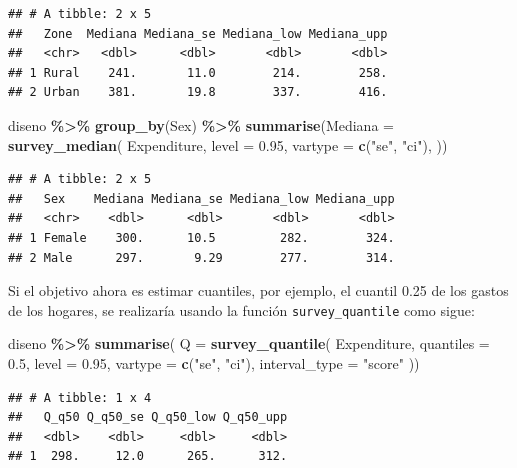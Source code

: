 \documentclass[
  spanish,
  12pt,
]{book}
\newenvironment{Shaded}{\begin{snugshade}}{\end{snugshade}}
\newcommand{\AttributeTok}[1]{\textcolor[rgb]{0.13,0.29,0.53}{#1}}
\newcommand{\FloatTok}[1]{\textcolor[rgb]{0.00,0.00,0.81}{#1}}
\newcommand{\FunctionTok}[1]{\textcolor[rgb]{0.13,0.29,0.53}{\textbf{#1}}}
\newcommand{\NormalTok}[1]{#1}
\newcommand{\SpecialCharTok}[1]{\textcolor[rgb]{0.81,0.36,0.00}{\textbf{#1}}}
\newcommand{\StringTok}[1]{\textcolor[rgb]{0.31,0.60,0.02}{#1}}
\begin{document}
\begin{verbatim}
## # A tibble: 2 x 5
##   Zone  Mediana Mediana_se Mediana_low Mediana_upp
##   <chr>   <dbl>      <dbl>       <dbl>       <dbl>
## 1 Rural    241.       11.0        214.        258.
## 2 Urban    381.       19.8        337.        416.
\end{verbatim}

\begin{Shaded}
\begin{Highlighting}[]
\NormalTok{diseno }\SpecialCharTok{\%\textgreater{}\%} \FunctionTok{group\_by}\NormalTok{(Sex) }\SpecialCharTok{\%\textgreater{}\%}
  \FunctionTok{summarise}\NormalTok{(}\AttributeTok{Mediana =}
  \FunctionTok{survey\_median}\NormalTok{(}
\NormalTok{    Expenditure,}
    \AttributeTok{level =} \FloatTok{0.95}\NormalTok{,}
    \AttributeTok{vartype =}  \FunctionTok{c}\NormalTok{(}\StringTok{"se"}\NormalTok{, }\StringTok{"ci"}\NormalTok{),}
\NormalTok{   ))}
\end{Highlighting}
\end{Shaded}

\begin{verbatim}
## # A tibble: 2 x 5
##   Sex    Mediana Mediana_se Mediana_low Mediana_upp
##   <chr>    <dbl>      <dbl>       <dbl>       <dbl>
## 1 Female    300.      10.5         282.        324.
## 2 Male      297.       9.29        277.        314.
\end{verbatim}

Si el objetivo ahora es estimar cuantiles, por ejemplo, el cuantil 0.25 de los gastos de los hogares, se realizaría usando la función \texttt{survey\_quantile} como sigue:

\begin{Shaded}
\begin{Highlighting}[]
\NormalTok{diseno }\SpecialCharTok{\%\textgreater{}\%}
  \FunctionTok{summarise}\NormalTok{(}
    \AttributeTok{Q =}  \FunctionTok{survey\_quantile}\NormalTok{(}
\NormalTok{    Expenditure,}
    \AttributeTok{quantiles =} \FloatTok{0.5}\NormalTok{,}
    \AttributeTok{level =} \FloatTok{0.95}\NormalTok{,}
    \AttributeTok{vartype =}  \FunctionTok{c}\NormalTok{(}\StringTok{"se"}\NormalTok{, }\StringTok{"ci"}\NormalTok{),}
    \AttributeTok{interval\_type =} \StringTok{"score"}
\NormalTok{   ))}
\end{Highlighting}
\end{Shaded}

\begin{verbatim}
## # A tibble: 1 x 4
##   Q_q50 Q_q50_se Q_q50_low Q_q50_upp
##   <dbl>    <dbl>     <dbl>     <dbl>
## 1  298.     12.0      265.      312.
\end{verbatim}
\end{document}
